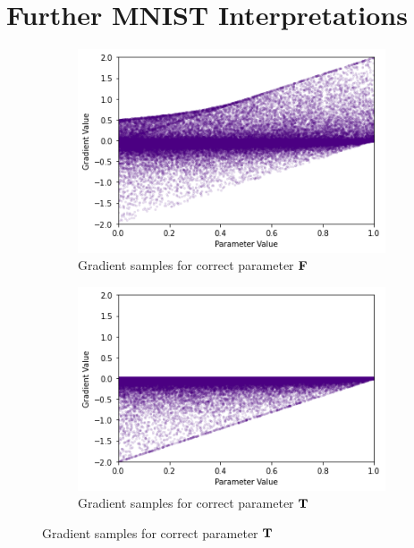 \chapter{Further MNIST Interpretations}
\label{section:moremnistinterp}

\begin{figure}[ht]
    \centering
    \begin{subfigure}[b]{0.47\textwidth}
        \centering
        \includegraphics[width=\textwidth]{imgs/grad_prod_2_falseparam.png}
        \caption{Gradient samples for correct parameter $\textbf{F}$}
        \label{fig:conjgrad2false}
    \end{subfigure}
    \begin{subfigure}[b]{0.47\textwidth}
        \centering
        \includegraphics[width=\textwidth]{imgs/grad_prod_2_trueparam.png}
        \caption{Gradient samples for correct parameter $\textbf{T}$}
        \label{fig:conjgrad2true}

\end{subfigure}
\end{figure}
